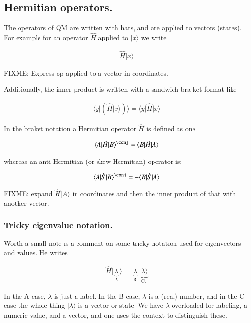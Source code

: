 \documentclass{article}
\newcommand{\ket}[1]{\lvert {#1} \rangle}
\newcommand{\bra}[1]{\langle {#1} \rvert}
\newcommand{\braket}[2]{\langle{#1} \vert {#2}\rangle}
\newcommand{\BraOpKet}[3]{\bra{#1} \hat{#2} \ket{#3} }
\newcommand{\hatH}[0]{\hat{H}}
\begin{document}
\subsection{ Hermitian operators. }

The operators of QM are written with hats, and are applied to vectors (states).  For example for an 
operator $\hatH$ applied to $\ket{x}$ we write

\begin{align*}
\hatH \ket{x}
\end{align*}

FIXME: Express op applied to a vector in coordinates.

Additionally, the inner product is written with a sandwich bra ket format like

\begin{align*}
\braket{y}{ \left(\hatH \ket{x} \right) }
=
\BraOpKet{y}{H}{x}
\end{align*}

In the braket notation a Hermitian operator $\hatH$ is defined as one 

\begin{align*}
\BraOpKet{A}{H}{B}^\conj = \BraOpKet{B}{H}{A}
\end{align*}

whereas an anti-Hermitian (or skew-Hermitian) operator is:

\begin{align*}
\BraOpKet{A}{S}{B}^\conj = -\BraOpKet{B}{S}{A}
\end{align*}

FIXME: expand $\hatH \ket{A}$ in coordinates and then the inner product of that with another vector.

\subsubsection{ Tricky eigenvalue notation. } 

Worth a small note is a comment on some tricky notation used for eigenvectors and values.  He writes

\begin{align*}
\hatH \ket{\underbrace{\lambda}_{\text{ A.}}} = \underbrace{\lambda}_{\text{ B. }} \underbrace{\ket{\lambda}}_{\text{C.}}
\end{align*}

In the A case, $\lambda$ is just a label.  In the B case, $\lambda$ is a (real) number, and in the C case the whole thing $\ket{\lambda}$ is a vector or state.  We have $\lambda$ overloaded for labeling, a numeric value, and a vector, and one uses the context to distinguish these.
\end{document}
